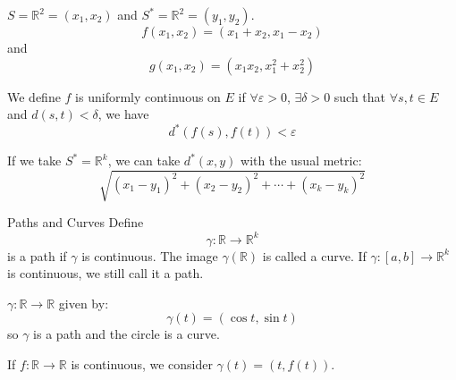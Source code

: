 \documentclass{report}
\begin{document}
\begin{examples}
    \begin{example}
        $S =  \mathbb{R}^{2} = (x_{1}, x_{2})$ and $S^{*} = \mathbb{R}^{2} = (y_{1}, y_{2})$.
            \begin{equation*}
                f(x_{1}, x_{2}) = (x_{1} + x_{2}, x_{1} - x_{2})
            \end{equation*}
        and
            \begin{equation*}
                g(x_{1}, x_{2}) = (x_{1}x_{2}, x_{1}^{2} + x_{2}^{2})
            \end{equation*}
    \end{example}
\end{examples}

We define $f$ is uniformly continuous on $E$ if $\forall \varepsilon > 0$, $\exists \delta > 0$ such that $\forall s, t \in E$ and $d(s, t) < \delta$, we have 
    \begin{equation*}
        d^{*}(f(s), f(t)) < \varepsilon
    \end{equation*}

If we take $S^{*} = \mathbb{R}^{k}$, we can take $d^{*}(x, y)$ with the usual metric:
    \begin{equation*}
        \sqrt{(x_{1} - y_{1})^{2} + (x_{2} - y_{2})^{2} + \cdots +(x_{k} - y_{k})^{2}}
    \end{equation*}

\begin{definition}{Paths and Curves}
    Define
        \begin{equation*}
            \gamma: \mathbb{R} \rightarrow \mathbb{R}^{k}
        \end{equation*}
    is a path if $\gamma$ is continuous. The image $\gamma(\mathbb{R})$ is called a curve. If $\gamma: [a, b] \rightarrow \mathbb{R}^{k}$ is continuous, we still call it a path.
\end{definition}

\begin{examples}
    \begin{example}
        $\gamma: \mathbb{R} \rightarrow \mathbb{R}$ given by:
            \begin{equation*}
                \gamma(t) = (\cos{t}, \sin{t})
            \end{equation*}
        so $\gamma$ is a path and the circle is a curve.
    \end{example} 
    \begin{example}
        If $f : \mathbb{R} \rightarrow \mathbb{R}$ is continuous, we consider $\gamma(t) = (t, f(t))$.
    \end{example}
\end{examples}
\end{document}
